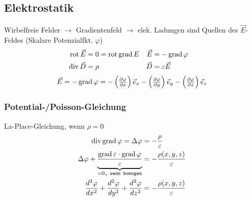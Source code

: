 \subsection{Elektrostatik}


Wirbelfreie Felder $\rightarrow$ Gradientenfeld $\rightarrow$ elek. Ladungen sind Quellen des $\vec{E}$-Feldes (Skalare Potenzialfkt. $ \varphi $)
\begin{align*}	
	\operatorname{rot} \vec{E} & = 0 = \operatorname{rot} \operatorname{grad} E & \vec{E} & = -\operatorname{grad} \varphi &\\
	\operatorname{div} \vec{D} & = \rho & \vec{D} & = \varepsilon \vec{E} &
\end{align*}
\begin{equation*}
	\vec{E} = -\operatorname{grad} \varphi = - \left( \tfrac{\partial \varphi}{\partial x}\right) \vec{e}_x - \left( \tfrac{\partial \varphi}{\partial y}\right) \vec{e}_y - \left( \tfrac{\partial \varphi}{\partial z}\right) \vec{e}_z
\end{equation*}


\subsubsection{Potential-/Poisson-Gleichung}
La-Place-Gleichung, wenn $ \rho = 0 $
\begin{align*}
	\operatorname{div} \operatorname{grad} \varphi = \Delta \varphi  &= - \dfrac{\rho}{\varepsilon}\\
    \Delta \varphi + \underbrace{ \dfrac{\operatorname{grad} \varepsilon \cdot \operatorname{grad} \varphi}{\varepsilon}}_{= 0\texttt{, wenn homogen}}
     & = - \dfrac{\rho (x, y, z)}{\varepsilon} \\
    \frac{d^2 \varphi}{d x^2} + \frac{d^2 \varphi}{d y^2} + \frac{d^2 \varphi}{d z^2}
     & = - \dfrac{\rho (x, y, z)}{\varepsilon}
\end{align*}

